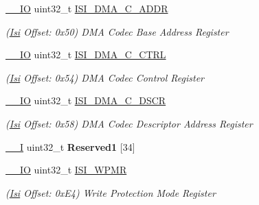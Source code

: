 \begin{DoxyCompactItemize}
\mbox{\hyperlink{core__cm7_8h_aec43007d9998a0a0e01faede4133d6be}{\+\_\+\+\_\+\+IO}} uint32\+\_\+t \mbox{\hyperlink{structIsi_a0504242da753226649e0066daa9a2b50}{I\+S\+I\+\_\+\+D\+M\+A\+\_\+\+C\+\_\+\+A\+D\+DR}}
\begin{DoxyCompactList}\small\item\em (\mbox{\hyperlink{structIsi}{Isi}} Offset\+: 0x50) D\+MA Codec Base Address Register \end{DoxyCompactList}\item 
\mbox{\label{structIsi_af52d7f364a6c5489089e44f5288e7f6a}} 
\mbox{\hyperlink{core__cm7_8h_aec43007d9998a0a0e01faede4133d6be}{\+\_\+\+\_\+\+IO}} uint32\+\_\+t \mbox{\hyperlink{structIsi_af52d7f364a6c5489089e44f5288e7f6a}{I\+S\+I\+\_\+\+D\+M\+A\+\_\+\+C\+\_\+\+C\+T\+RL}}
\begin{DoxyCompactList}\small\item\em (\mbox{\hyperlink{structIsi}{Isi}} Offset\+: 0x54) D\+MA Codec Control Register \end{DoxyCompactList}\item 
\mbox{\label{structIsi_a64e3d008a8e86922059766bb17886201}} 
\mbox{\hyperlink{core__cm7_8h_aec43007d9998a0a0e01faede4133d6be}{\+\_\+\+\_\+\+IO}} uint32\+\_\+t \mbox{\hyperlink{structIsi_a64e3d008a8e86922059766bb17886201}{I\+S\+I\+\_\+\+D\+M\+A\+\_\+\+C\+\_\+\+D\+S\+CR}}
\begin{DoxyCompactList}\small\item\em (\mbox{\hyperlink{structIsi}{Isi}} Offset\+: 0x58) D\+MA Codec Descriptor Address Register \end{DoxyCompactList}\item 
\mbox{\label{structIsi_a6ffa51c814e74f69d71fc60866f10253}} 
\mbox{\hyperlink{core__cm7_8h_af63697ed9952cc71e1225efe205f6cd3}{\+\_\+\+\_\+I}} uint32\+\_\+t {\bfseries Reserved1} \mbox{[}34\mbox{]}
\item 
\mbox{\label{structIsi_aff07955efb3db443eca2447e15445176}} 
\mbox{\hyperlink{core__cm7_8h_aec43007d9998a0a0e01faede4133d6be}{\+\_\+\+\_\+\+IO}} uint32\+\_\+t \mbox{\hyperlink{structIsi_aff07955efb3db443eca2447e15445176}{I\+S\+I\+\_\+\+W\+P\+MR}}
\begin{DoxyCompactList}\small\item\em (\mbox{\hyperlink{structIsi}{Isi}} Offset\+: 0x\+E4) Write Protection Mode Register \end{DoxyCompactList}\item 

\end{DoxyCompactItemize}
